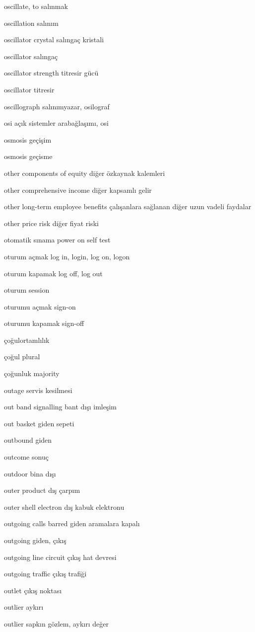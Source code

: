 \documentclass[12pt,fleqn]{article}\usepackage{../../common}
\begin{document}
oscillate, to salınmak

oscillation salınım

oscillator crystal salıngaç kristali

oscillator salıngaç

oscillator strength titresir gücü

oscillator titresir

oscillograph salınımyazar, osilograf

osi açık sistemler arabağlaşımı, osi

osmosis geçişim

osmosis geçisme

other components of equity diğer özkaynak kalemleri

other comprehensive income diğer kapsamlı gelir

other long-term employee benefits çalışanlara sağlanan diğer uzun vadeli faydalar

other price risk diğer fiyat riski

otomatik sınama power on self test

oturum açmak log in, login, log on, logon

oturum kapamak log off, log out

oturum session

oturumu açmak sign-on

oturumu kapamak sign-off

çoğulortamlılık

çoğul plural

çoğunluk majority

outage servis kesilmesi

out band signalling bant dışı imleşim

out basket giden sepeti

outbound giden

outcome sonuç

outdoor bina dışı

outer product dış çarpım

outer shell electron dış kabuk elektronu

outgoing calls barred giden aramalara kapalı

outgoing giden, çıkış

outgoing line circuit çıkış hat devresi

outgoing traffic çıkış trafiği

outlet çıkış noktası

outlier aykırı

outlier sapkın gözlem, aykırı değer
\end{document}
